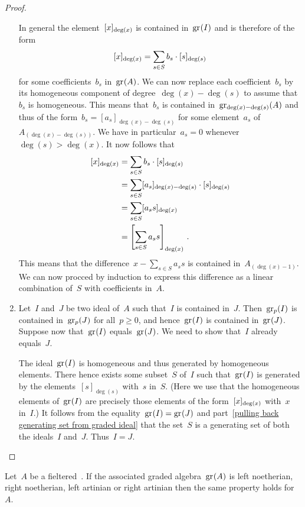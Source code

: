 \begin{proof}
\begin{enumerate}
      In general the element~$\lbrack x\rbrack_{\deg(x)}$ is contained in~$\gr(I)$ and is therefore of the form
      \[
        \lbrack x\rbrack_{\deg(x)}
        =
        \sum_{s \in S} b_s \cdot [s]_{\deg(s)}
      \]
      for some coefficients~$b_s$ in~$\gr(A)$.
      We can now replace each coefficient~$b_s$ by its homogeneous component of degree~$\deg(x) - \deg(s)$ to assume that~$b_s$ is homogeneous.
      This means that~$b_s$ is contained in~$\gr[\deg(x)-\deg(s)](A)$ and thus of the form~$b_s = [a_s]_{\deg(x)-\deg(s)}$ for some element~$a_s$ of~$A_{(\deg(x)-\deg(s))}$.
      We have in particular~$a_s = 0$ whenever~$\deg(s) > \deg(x)$.
      It now follows that
      \begin{align*}
        \lbrack x\rbrack_{\deg(x)}
        &=
        \sum_{s \in S} b_s \cdot [s]_{\deg(s)}
        \\
        &=
        \sum_{s \in S} [a_s]_{\deg(x) - \deg(s)} \cdot [s]_{\deg(s)}
        \\
        &=
        \sum_{s \in S} [a_s s]_{\deg(x)}
        \\
        &=
        \left[ \sum_{s \in S} a_s s \right]_{\deg(x)} \,.
      \end{align*}
      This means that the difference~$x - \sum_{s \in S} a_s s$ is contained in~$A_{(\deg(x)-1)}$.
      We can now procced by induction to express this difference as a linear combination of~$S$ with coefficients in~$A$.
    \item
      Let~$I$ and~$J$ be two ideal of~$A$ such that~$I$ is contained in~$J$.
      Then~$\gr[p](I)$ is contained in~$\gr[p](J)$ for all~$p \geq 0$, and hence~$\gr(I)$ is contained in~$\gr(J)$.
      Suppose now that~$\gr(I)$ equals~$\gr(J)$.
      We need to show that~$I$ already equals~$J$.

      The ideal~$\gr(I)$ is homogeneous and thus generated by homogeneous elements.
      There hence exists some subset~$S$ of~$I$ such that~$\gr(I)$ is generated by the elements~$[s]_{\deg(s)}$ with~$s$ in~$S$.
      (Here we use that the homogeneous elements of~$\gr(I)$ are precisely those elements of the form~$\lbrack x\rbrack_{\deg(x)}$ with~$x$ in~$I$.)
      It follows from the equality~$\gr(I) = \gr(J)$ and part~\ref*{pulling back generating set from graded ideal} that the set~$S$ is a generating set of both the ideals~$I$ and~$J$.
      Thus~$I = J$.
    \qedhere
  \end{enumerate}
\end{proof}


\begin{corollary}
  \label{universal enveloping reflects chain conditions}
  Let~$A$ be a fieltered~\algebra{$\kf$}.
  If the associated graded algebra~$\gr(A)$ is left noetherian, right noetherian, left artinian or right artinian then the same property holds for~$A$.
\end{corollary}


